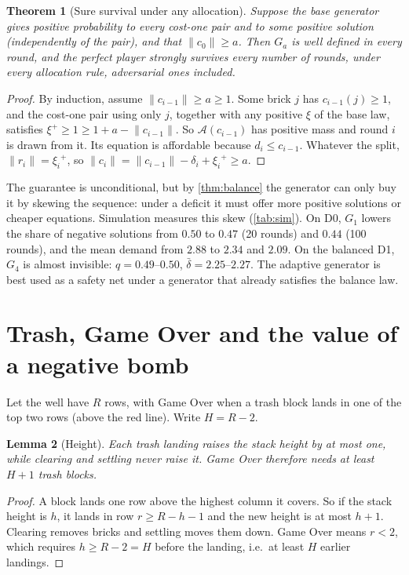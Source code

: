 \documentclass[11pt,a4paper]{article}
\newtheorem{theorem}{Theorem}[section]
\newtheorem{lemma}[theorem]{Lemma}
\theoremstyle{definition}
\theoremstyle{remark}
\newcommand{\norm}[1]{\lVert #1\rVert}
\newcommand{\pos}[1]{{#1}^{+}}
\begin{document}
\begin{theorem}[Sure survival under any allocation]\label{thm:adaptive}
Suppose the base generator gives positive probability to every cost-one pair and to
some positive solution (independently of the pair), and that $\norm{c_0}\ge a$. Then $G_a$ is well defined in every round, and the
perfect player strongly survives every number of rounds, under \emph{every} allocation
rule, adversarial ones included.
\end{theorem}
\begin{proof}
By induction, assume $\norm{c_{i-1}}\ge a\ge1$. Some brick $j$ has $c_{i-1}(j)\ge1$, and
the cost-one pair using only $j$, together with any positive $\xi$ of the base law,
satisfies $\pos\xi\ge1\ge1+a-\norm{c_{i-1}}$. So $\mathcal A(c_{i-1})$ has positive mass and round
$i$ is drawn from it. Its equation is affordable because $d_i\le c_{i-1}$. Whatever the
split, $\norm{r_i}=\pos{\xi_i}$, so
$\norm{c_i}=\norm{c_{i-1}}-\delta_i+\pos{\xi_i}\ge a$.
\end{proof}

The guarantee is unconditional, but by \cref{thm:balance} the generator can only buy it
by skewing the sequence: under a deficit it must offer more positive solutions or
cheaper equations. Simulation measures this skew (\cref{tab:sim}). On D0, $G_1$ lowers the
share of negative solutions from $0.50$ to $0.47$ (20 rounds) and $0.44$ (100 rounds),
and the mean demand from $2.88$ to $2.34$ and $2.09$. On the balanced D1, $G_4$ is
almost invisible: $q=0.49$--$0.50$, $\bar\delta=2.25$--$2.27$. The adaptive generator is
best used as a safety net under a generator that already satisfies the balance law.

\section{Trash, Game Over and the value of a negative bomb}\label{sec:trash}

Let the well have $R$ rows, with Game Over when a trash block lands in one of the top
two rows (above the red line). Write $H=R-2$.

\begin{lemma}[Height]\label{lem:height}
Each trash landing raises the stack height by at most one, while clearing and settling
never raise it. Game Over therefore needs at least $H+1$ trash blocks.
\end{lemma}
\begin{proof}
A block lands one row above the highest column it covers. So if the stack height is $h$,
it lands in row $r\ge R-h-1$ and the new height is at most $h+1$. Clearing removes
bricks and settling moves them down. Game Over means $r<2$, which requires
$h\ge R-2=H$ before the landing, i.e.\ at least $H$ earlier landings.
\end{proof}
\end{document}
